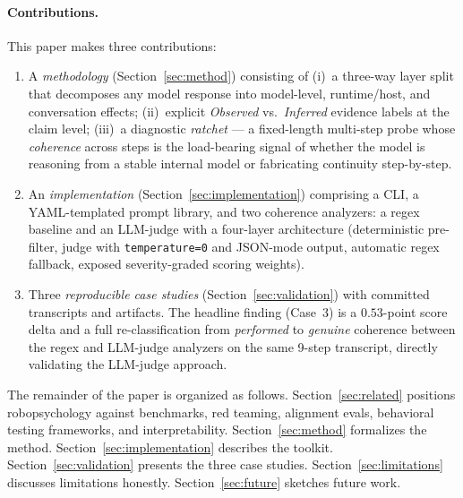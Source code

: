 \paragraph{Contributions.}
This paper makes three contributions:
\begin{enumerate}
    \item A \emph{methodology} (Section~\ref{sec:method}) consisting of
          (i)~a three-way layer split that decomposes any model response
          into model-level, runtime/host, and conversation effects;
          (ii)~explicit \emph{Observed} vs.\ \emph{Inferred} evidence
          labels at the claim level; (iii)~a diagnostic \emph{ratchet}
          --- a fixed-length multi-step probe whose \emph{coherence}
          across steps is the load-bearing signal of whether the model
          is reasoning from a stable internal model or fabricating
          continuity step-by-step.
    \item An \emph{implementation} (Section~\ref{sec:implementation})
          comprising a CLI, a YAML-templated prompt library, and two
          coherence analyzers: a regex baseline and an LLM-judge with a
          four-layer architecture (deterministic pre-filter, judge with
          \texttt{temperature=0} and JSON-mode output, automatic
          regex fallback, exposed severity-graded scoring weights).
    \item Three \emph{reproducible case studies}
          (Section~\ref{sec:validation}) with committed transcripts and
          artifacts. The headline finding (Case~3) is a $0.53$-point
          score delta and a full re-classification from
          \emph{performed} to \emph{genuine} coherence between the
          regex and LLM-judge analyzers on the same 9-step transcript,
          directly validating the LLM-judge approach.
\end{enumerate}

The remainder of the paper is organized as follows. Section~\ref{sec:related}
positions robopsychology against benchmarks, red teaming, alignment evals,
behavioral testing frameworks, and interpretability.
Section~\ref{sec:method} formalizes the method.
Section~\ref{sec:implementation} describes the toolkit.
Section~\ref{sec:validation} presents the three case studies.
Section~\ref{sec:limitations} discusses limitations honestly.
Section~\ref{sec:future} sketches future work.

